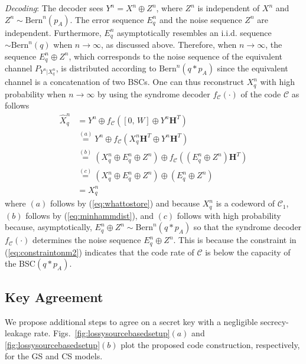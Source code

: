 \documentclass[journal,10pt,twoside]{IEEEtran}
\newcommand*\xor{\mathbin{\oplus}}
\begin{document}
\emph{Decoding}: The decoder sees $Y^n = X^n\xor Z^n$, where $Z^n$ is independent of $X^n$ and $Z^n\sim\text{Bern}^n(p_A)$. The error sequence $E_{q}^n$ and the noise sequence $Z^n$ are independent. Furthermore, $E_{q}^n$ asymptotically resembles an i.i.d. sequence $\sim\text{Bern}^n(q)$ when $n\rightarrow \infty$, as discussed above. Therefore, when $n\rightarrow\infty$, the sequence $E_{q}^n\xor Z^n$, which corresponds to the noise sequence of the equivalent channel $\displaystyle P_{Y^n|X_q^n}$, is distributed according to $\text{Bern}^n(q*p_A)$ since the equivalent channel is a concatenation of two BSCs. One can thus reconstruct $X_{q}^n$ with high probability when $n\rightarrow\infty$ by using the syndrome decoder $f_{\mathcal{C}}(\cdot)$ of the code $\mathcal{C}$ as follows
\begin{align}
\widehat{X}_{q}^n& = Y^n\xor {f_{\mathcal{C}}([0,\, W]\xor Y^{n}\mathbf{H}^T)}\nonumber\\ 
&\overset{(a)}{=} Y^n\xor {f_{\mathcal{C}}(X_{q}^{n}\mathbf{H}^T\xor Y^{n}\mathbf{H}^T)}\nonumber\\
&\overset{(b)}{=}  (X_{q}^n\xor E_{q}^n\xor Z^n)\xor {f_{\mathcal{C}}((E_{q}^{n}\xor Z^{n})\mathbf{H}^T)}\nonumber\\
&\overset{(c)}{=} (X_{q}^n\xor E_{q}^n\xor Z^n)\xor (E_{q}^n\xor Z^n)\nonumber\\
&=X_{q}^n\label{eq:estimateXqn}
\end{align}
where $(a)$ follows by (\ref{eq:whattostore}) and because $X_{q}^n$ is a codeword of $\mathcal{C}_1$, $(b)$ follows by (\ref{eq:minhammdist}), and $(c)$ follows with high probability because, asymptotically, $E_{q}^n\xor Z^n\sim \text{Bern}^n(q*p_A)$ so that the syndrome decoder $f_{\mathcal{C}}(\cdot)$ determines the noise sequence $E_{q}^n\xor Z^n$. This is because the constraint in (\ref{eq:constraintonm2}) indicates that the code rate of $\mathcal{C}$ is below the capacity of the BSC$(q*p_A)$.

\subsection{Key Agreement}\label{subsec:SKWZfirstconstruct}
We propose additional steps to agree on a secret key with a negligible secrecy-leakage rate. Figs.~\ref{fig:lossysourcebasedsetup}$(a)$ and \ref{fig:lossysourcebasedsetup}$(b)$ plot the proposed code construction, respectively, for the GS and CS models. 
\end{document}
